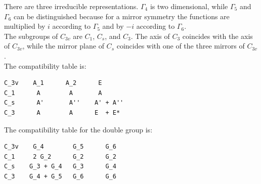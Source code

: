 \documentclass[12pt,a4paper]{article}
\begin{document}
There are three irreducible representations. $\Gamma_4$ is two dimensional, while
$\Gamma_5$ and $\Gamma_6$ can be distinguished because for a mirror symmetry the
functions are multiplied by $i$ according to $\Gamma_5$ and by $-i$ according to
$\Gamma_6$. \\
The subgroups of $C_{3v}$ are $C_1$, $C_s$, and $C_3$. The axis of $C_3$ coincides
with the axis of $C_{3v}$, while the mirror plane of $C_s$ coincides with
one of the three mirrors of $C_{3v}$. \\
The compatibility table is:
\begin{verbatim}
C_3v    A_1      A_2      E
C_1      A        A       A
C_s      A'       A''    A' + A''
C_3      A        A      E  + E*
\end{verbatim}
The compatibility table for the double group is:
\begin{verbatim}
C_3v    G_4        G_5      G_6
C_1     2 G_2      G_2      G_2
C_s    G_3 + G_4   G_3      G_4
C_3    G_4 + G_5   G_6      G_6
\end{verbatim}
\end{document}

